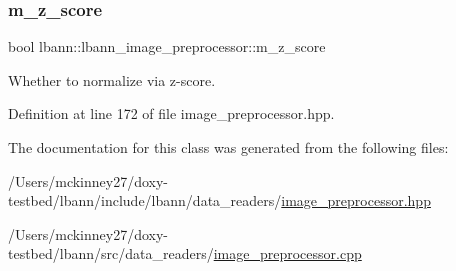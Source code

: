 \subsubsection{\texorpdfstring{m\+\_\+z\+\_\+score}{m\_z\_score}}
{\footnotesize\ttfamily bool lbann\+::lbann\+\_\+image\+\_\+preprocessor\+::m\+\_\+z\+\_\+score\hspace{0.3cm}{\ttfamily [protected]}}

Whether to normalize via z-\/score. 

Definition at line 172 of file image\+\_\+preprocessor.\+hpp.



The documentation for this class was generated from the following files\+:\begin{DoxyCompactItemize}
\item 
/\+Users/mckinney27/doxy-\/testbed/lbann/include/lbann/data\+\_\+readers/\hyperlink{image__preprocessor_8hpp}{image\+\_\+preprocessor.\+hpp}\item 
/\+Users/mckinney27/doxy-\/testbed/lbann/src/data\+\_\+readers/\hyperlink{image__preprocessor_8cpp}{image\+\_\+preprocessor.\+cpp}\end{DoxyCompactItemize}
